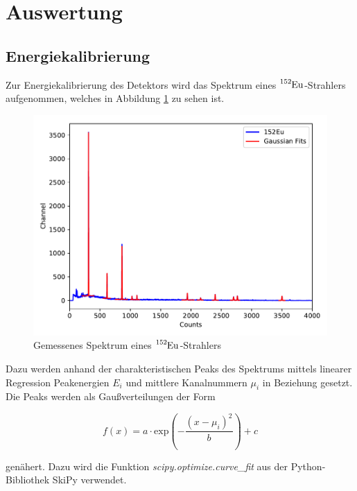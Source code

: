 \section{Auswertung}
\label{sec:Auswertung}


\subsection{Energiekalibrierung}

Zur Energiekalibrierung des Detektors wird das Spektrum eines $\ce{^{152}Eu}$-Strahlers aufgenommen, welches in Abbildung
\ref{fig:plot1} zu sehen ist.

\begin{figure}
  \centering
  \includegraphics{content/plot1.pdf}
  \caption{Gemessenes Spektrum eines $\ce{^{152}Eu}$-Strahlers}
  \label{fig:plot1}
\end{figure}

Dazu werden anhand der charakteristischen Peaks des Spektrums mittels linearer Regression Peakenergien $E_i$ und mittlere 
Kanalnummern $\mu_i$ in Beziehung gesetzt.
Die Peaks werden als Gaußverteilungen der Form 

\begin{equation}
  f(x) = a \cdot \text{exp}\left( - \frac{(x-\mu_i)^2}{b}\right) + c
\end{equation}

genähert. Dazu wird die Funktion \textit{scipy.optimize.curve\_fit} aus der Python-Bibliothek SkiPy verwendet.

